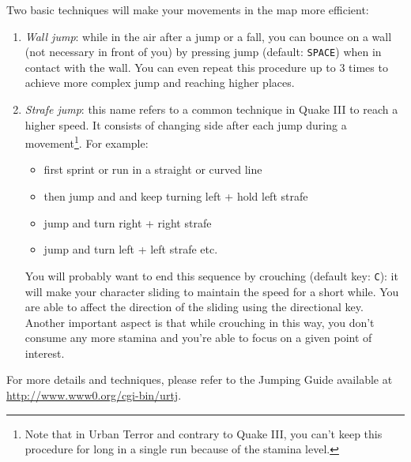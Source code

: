 \begin{description}
  Two basic techniques will make your movements in the map more efficient: 
  \begin{enumerate}
  \item \emph{Wall jump}: while in the air after a jump or a fall, you can
    bounce on a wall (not necessary in front of you) by pressing jump (default:
    \texttt{SPACE}) when in contact with the wall. 
    You can even repeat this procedure up to 3 times to achieve more complex
    jump and reaching higher places.
  \item \emph{Strafe jump}: this name refers to a common technique in Quake III
    to reach a higher speed. It consists of changing side after each jump during
    a movement\footnote{Note that in Urban Terror and contrary to Quake III, you
      can't keep this procedure for long in a single run because of the stamina
      level.}.   
    For example:
    \begin{itemize}
    \item first sprint or run in a straight or curved line
    \item then jump and and keep turning left + hold left strafe
    \item jump and turn right + right strafe
    \item jump and turn left + left strafe etc. 
    \end{itemize}
    You will probably want to end this sequence by crouching (default key:
    \texttt{C}): it will make your character sliding to maintain the speed for a
    short while. You are able to affect the direction of the sliding using the
    directional key. Another important aspect is that while crouching in this
    way, you don't consume any more stamina and you're able to focus on a given
    point of interest.   
  \end{enumerate}
  For more details and techniques, please refer to the Jumping Guide available
  at \url{http://www.www0.org/cgi-bin/urtj}. 


\end{description}

